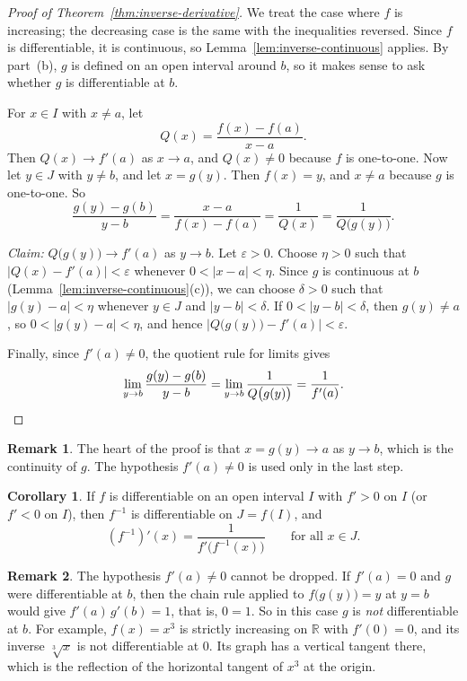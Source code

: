 \documentclass[12pt,letterpaper]{article}
\theoremstyle{definition}
\newtheorem{corollary}[theorem]{Corollary}
\newtheorem*{remark}{Remark}
\begin{document}
\begin{proof}[Proof of Theorem~\ref{thm:inverse-derivative}]
  We treat the case where $f$ is increasing; the decreasing case is the same
  with the inequalities reversed. Since $f$ is differentiable, it is
  continuous, so Lemma~\ref{lem:inverse-continuous} applies. By part~(b), $g$
  is defined on an open interval around $b$, so it makes sense to ask whether
  $g$ is differentiable at $b$.

  For $x\in I$ with $x\neq a$, let
  \[
    Q(x)=\frac{f(x)-f(a)}{x-a}.
  \]
  Then $Q(x)\to f'(a)$ as $x\to a$, and $Q(x)\neq0$ because $f$ is one-to-one.
  Now let $y\in J$ with $y\neq b$, and let $x=g(y)$. Then $f(x)=y$, and
  $x\neq a$ because $g$ is one-to-one. So
  \[
    \frac{g(y)-g(b)}{y-b}=\frac{x-a}{f(x)-f(a)}=\frac{1}{Q(x)}
      =\frac{1}{Q\bigl(g(y)\bigr)}.
  \]

  \emph{Claim:} $Q\bigl(g(y)\bigr)\to f'(a)$ as $y\to b$. Let
  $\varepsilon>0$. Choose $\eta>0$ such that $|Q(x)-f'(a)|<\varepsilon$
  whenever $0<|x-a|<\eta$. Since $g$ is continuous at $b$
  (Lemma~\ref{lem:inverse-continuous}(c)), we can choose $\delta>0$ such that
  $|g(y)-a|<\eta$ whenever $y\in J$ and $|y-b|<\delta$. If
  $0<|y-b|<\delta$, then $g(y)\neq a$, so $0<|g(y)-a|<\eta$, and hence
  $\bigl|Q\bigl(g(y)\bigr)-f'(a)\bigr|<\varepsilon$.

  Finally, since $f'(a)\neq0$, the quotient rule for limits gives
  \[
    \lim_{y\to b}\frac{g(y)-g(b)}{y-b}
      =\lim_{y\to b}\frac{1}{Q\bigl(g(y)\bigr)}=\frac{1}{f'(a)}.
    \qedhere
  \]
\end{proof}

\begin{remark}
  The heart of the proof is that $x=g(y)\to a$ as $y\to b$, which is the
  continuity of $g$. The hypothesis $f'(a)\neq0$ is used only in the last
  step.
\end{remark}

\begin{corollary}\label{cor:inverse-derivative}
  If $f$ is differentiable on an open interval $I$ with $f'>0$ on $I$ (or
  $f'<0$ on $I$), then $f^{-1}$ is differentiable on $J=f(I)$, and
  \[
    (f^{-1})'(x)=\frac{1}{f'\bigl(f^{-1}(x)\bigr)}
    \qquad\text{for all } x\in J.
  \]
\end{corollary}

\begin{remark}
  The hypothesis $f'(a)\neq0$ cannot be dropped. If $f'(a)=0$ and $g$ were
  differentiable at $b$, then the chain rule applied to $f\bigl(g(y)\bigr)=y$
  at $y=b$ would give $f'(a)\,g'(b)=1$, that is, $0=1$. So in this case $g$ is
  \emph{not} differentiable at $b$. For example, $f(x)=x^3$ is strictly
  increasing on $\mathbb{R}$ with $f'(0)=0$, and its inverse $\sqrt[3]{x}$ is
  not differentiable at $0$. Its graph has a vertical tangent there, which is
  the reflection of the horizontal tangent of $x^3$ at the origin.
\end{remark}
\end{document}
